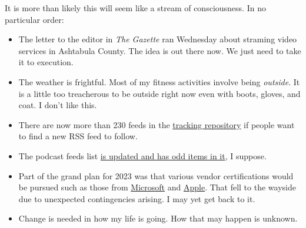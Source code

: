 It is more than likely this will seem like a stream of consciousness. In
no particular order:

\begin{itemize}
\tightlist
\item
  The letter to the editor in \emph{The Gazette} ran Wednesday about
  straming video services in Ashtabula County. The idea is out there
  now. We just need to take it to execution.
\item
  The weather is frightful. Most of my fitness activities involve being
  \emph{outside}. It is a little too treacherous to be outside right now
  even with boots, gloves, and coat. I don't like this.
\item
  There are now more than 230 feeds in the
  \href{https://code.launchpad.net/~skellat/+git/FeedReadingFeeds}{tracking
  repository} if people want to find a new RSS feed to follow.
\item
  The podcast feeds list
  \href{https://code.launchpad.net/~skellat/+git/Podcasting}{is updated
  and has odd items in it}, I suppose.
\item
  Part of the grand plan for 2023 was that various vendor certifications
  would be pursued such as those from
  \href{https://learn.microsoft.com/en-us/certifications/}{Microsoft}
  and \href{https://training.apple.com/it}{Apple}. That fell to the
  wayside due to unexpected contingencies arising. I may yet get back to
  it.
\item
  Change is needed in how my life is going. How that may happen is
  unknown.
\end{itemize}
